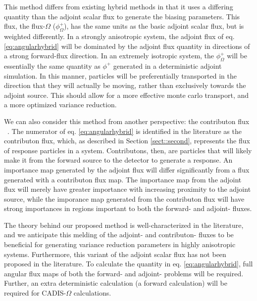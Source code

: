 \documentclass[12pt]{article}
\begin{document}
This method differs from existing hybrid methods in that it uses a differing quantity than the adjoint scalar flux to generate the biasing parameters. This flux, the flux-$\Omega$ ($\phi^{+}_{\Omega}$), has the same units as the basic adjoint scalar flux, but is weighted differently. In a strongly anisotropic system, the adjoint flux of eq. \eqref{eq:angularhybrid} will be dominated by the adjoint flux quantity in directions of a strong forward-flux direction. In an extremely isotropic system, the $\phi^{+}_{\Omega}$ will be essentially the same quantity as $\phi^{+}$ generated in a deterministic adjoint simulation. In this manner, particles will be preferentially transported in the direction that they will actually be moving, rather than exclusively towards the adjoint source. This should allow for a more effective monte carlo transport, and a more optimized variance reduction. 

We can also consider this method from another perspective: the contributon flux ~\cite{williams_contributorn_1992}. The numerator of eq. \eqref{eq:angularhybrid} is identified in the literature as the contributon flux, which, as described in Section \ref{sect::second}, represents the flux of response particles in a system. Contributons, then, are particles that will likely make it from the forward source to the detector to generate a response. An importance map generated by the adjoint flux will differ significantly from a flux generated with a contributon flux map. The importance map from the adjoint flux will merely have greater importance with increasing proximity to the adjoint source, while the imporance map generated from the contributon flux will have strong importances in regions important to both the forward- and adjoint- fluxes. 

The theory behind our proposed method is well-characterized in the literature, and we anticipate this melding of the adjoint- and contributon- fluxes to be beneficial for generating variance reduction parameters in highly anisotropic systems. Furthermore, this variant of the adjoint scalar flux has not been proposed in the literature. To calculate the quantity in eq. \eqref{eq:angularhybrid}, full angular flux maps of both the forward- and adjoint- problems will be required. Further, an extra deterministic calculation (a forward calculation) will be required for CADIS-$\Omega$ calculations.


\end{document}
